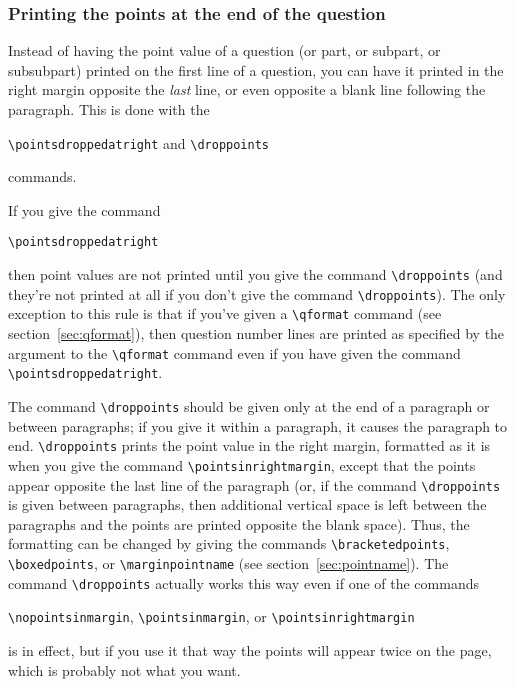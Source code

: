 \documentclass[12pt]{exam}
\begin{document}
\subsubsection{Printing the points at the end of the question}
\label{sec:DrpPts}

Instead of having the point value of a question (or part, or subpart,
or subsubpart) printed on the first line of a question, you can have
it printed in the right margin opposite the \emph{last} line, or even
opposite a blank line following the paragraph.  This is done with the
\begin{center}
  \verb"\pointsdroppedatright"
  \quad and \quad
  \verb"\droppoints"
\end{center}
commands.

If you give the command
\begin{center}
  \verb"\pointsdroppedatright"
\end{center}
then point values are not printed until you give the command
\verb"\droppoints" (and they're not printed at all if you don't give
the command \verb"\droppoints").  The only exception to this rule is
that if you've given a \verb"\qformat" command (see
section~\ref{sec:qformat}), then question number lines are printed as
specified by the argument to the \verb"\qformat" command even if you
have given the command \verb"\pointsdroppedatright".

The command \verb"\droppoints" should be given only at the end of a
paragraph or between paragraphs; if you give it within a paragraph, it
causes the paragraph to end.  \verb"\droppoints" prints the point
value in the right margin, formatted as it is when you give the
command \verb"\pointsinrightmargin", except that the points appear
opposite the last line of the paragraph (or, if the command
\verb"\droppoints" is given between paragraphs, then additional
vertical space is left between the paragraphs and the points are
printed opposite the blank space).  Thus, the formatting can be
changed by giving the commands \verb"\bracketedpoints",
\verb"\boxedpoints", or \verb"\marginpointname" (see
section~\ref{sec:pointname}).  The command \verb"\droppoints" actually
works this way even if one of the commands
\begin{center}
  \verb"\nopointsinmargin", \verb"\pointsinmargin", or
  \verb"\pointsinrightmargin"
\end{center}
is in effect, but if you use it that way the points will appear twice
on the page, which is probably not what you want.
\end{document}
